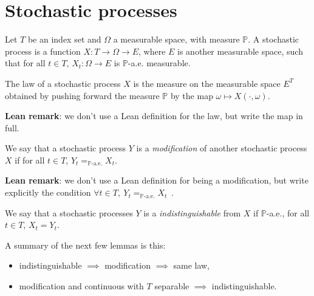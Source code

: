 \chapter{Stochastic processes}
\label{chap:process}

Let $T$ be an index set and $\Omega$ a measurable space, with measure $\mathbb{P}$.
A stochastic process is a function $X : T \to \Omega \to E$, where $E$ is another measurable space, such that for all $t \in T$, $X_t : \Omega \to E$ is $\mathbb{P}$-a.e. measurable.


\begin{definition}\label{def:processLaw}
  \leanok
The law of a stochastic process $X$ is the measure on the measurable space $E^T$ obtained by pushing forward the measure $\mathbb{P}$ by the map $\omega \mapsto X(\cdot, \omega)$.
\end{definition}

\textbf{Lean remark}: we don't use a Lean definition for the law, but write the map in full.

\begin{definition}[Modification]\label{def:modification}
  \leanok
We say that a stochastic process $Y$ is a \emph{modification} of another stochastic process $X$ if for all $t \in T$, $Y_t =_{\mathbb{P}\text{-a.e.}} X_t$.
\end{definition}

\textbf{Lean remark}: we don't use a Lean definition for being a modification, but write explicitly the condition $\forall t \in T,\ Y_t =_{\mathbb{P}\text{-a.e.}} X_t$~.

\begin{definition}[Indistinguishable]\label{def:indistinguishable}
  \leanok
We say that a stochastic processes $Y$ is a \emph{indistinguishable} from $X$ if $\mathbb{P}$-a.e., for all $t \in T$, $X_t = Y_t$.
\end{definition}

A summary of the next few lemmas is this:
\begin{itemize}
  \item indistinguishable $\implies$ modification $\implies$ same law,
  \item modification and continuous with $T$ separable $\implies$ indistinguishable.
\end{itemize}
















